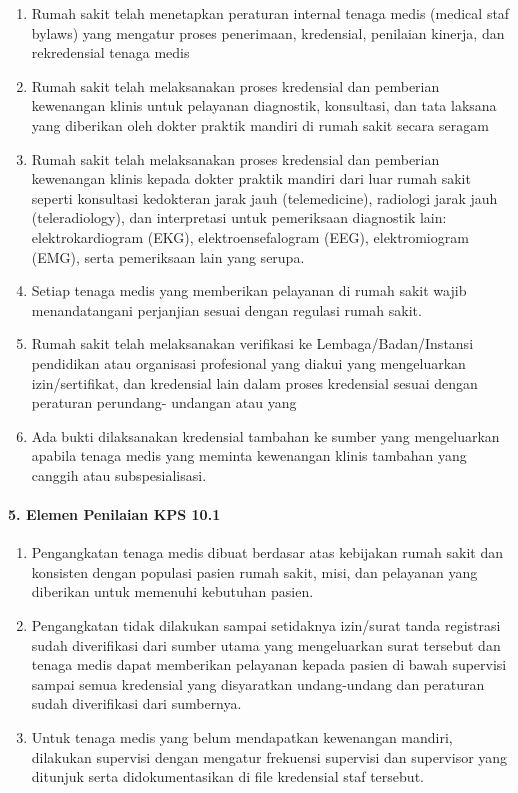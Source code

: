 \documentclass[
]{book}
\providecommand{\tightlist}{%
  \setlength{\itemsep}{0pt}\setlength{\parskip}{0pt}}
\begin{document}
\begin{enumerate}
\def\labelenumi{\alph{enumi}.}
\tightlist
\item
  Rumah sakit telah menetapkan peraturan internal tenaga medis (medical staf bylaws) yang mengatur proses penerimaan, kredensial, penilaian kinerja, dan rekredensial tenaga medis
\item
  Rumah sakit telah melaksanakan proses kredensial dan pemberian kewenangan klinis untuk pelayanan diagnostik, konsultasi, dan tata laksana yang diberikan oleh dokter praktik mandiri di rumah sakit secara seragam
\item
  Rumah sakit telah melaksanakan proses kredensial dan pemberian kewenangan klinis kepada dokter praktik mandiri dari luar rumah sakit seperti konsultasi kedokteran jarak jauh (telemedicine), radiologi jarak jauh (teleradiology), dan interpretasi untuk pemeriksaan diagnostik lain: elektrokardiogram (EKG), elektroensefalogram (EEG), elektromiogram (EMG), serta pemeriksaan lain yang serupa.
\item
  Setiap tenaga medis yang memberikan pelayanan di rumah sakit wajib menandatangani perjanjian sesuai dengan regulasi rumah sakit.
\item
  Rumah sakit telah melaksanakan verifikasi ke Lembaga/Badan/Instansi pendidikan atau organisasi profesional yang diakui yang mengeluarkan izin/sertifikat, dan kredensial lain dalam proses kredensial sesuai dengan peraturan perundang- undangan atau yang
\item
  Ada bukti dilaksanakan kredensial tambahan ke sumber yang mengeluarkan apabila tenaga medis yang meminta kewenangan klinis tambahan yang canggih atau subspesialisasi.
\end{enumerate}

\hypertarget{elemen-penilaian-kps-10.1}{%
\paragraph*{5. Elemen Penilaian KPS 10.1}\label{elemen-penilaian-kps-10.1}}

\begin{enumerate}
\def\labelenumi{\alph{enumi}.}
\tightlist
\item
  Pengangkatan tenaga medis dibuat berdasar atas kebijakan rumah sakit dan konsisten dengan populasi pasien rumah sakit, misi, dan pelayanan yang diberikan untuk memenuhi kebutuhan pasien.
\item
  Pengangkatan tidak dilakukan sampai setidaknya izin/surat tanda registrasi sudah diverifikasi dari sumber utama yang mengeluarkan surat tersebut dan tenaga medis dapat memberikan pelayanan kepada pasien di bawah supervisi sampai semua kredensial yang disyaratkan undang-undang dan peraturan sudah diverifikasi dari sumbernya.
\item
  Untuk tenaga medis yang belum mendapatkan kewenangan mandiri, dilakukan supervisi dengan mengatur frekuensi supervisi dan supervisor yang ditunjuk serta didokumentasikan di file kredensial staf tersebut.
\end{enumerate}
\end{document}
